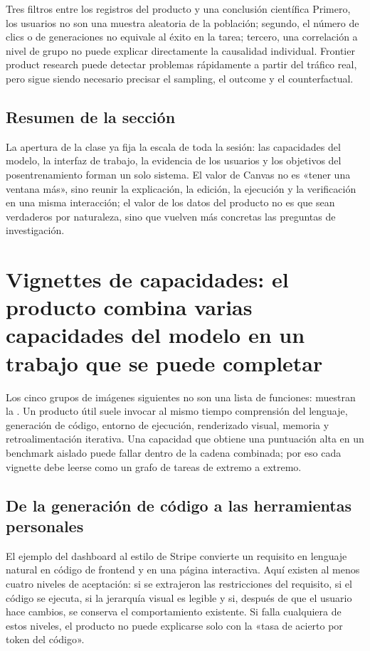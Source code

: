 \documentclass[a4paper]{article}
\begin{document}
\begin{warningbox}{Tres filtros entre los registros del producto y una conclusión científica}
Primero, los usuarios no son una muestra aleatoria de la población; segundo, el número de clics o de generaciones no equivale al éxito en la tarea; tercero, una correlación a nivel de grupo no puede explicar directamente la causalidad individual. Frontier product research puede detectar problemas rápidamente a partir del tráfico real, pero sigue siendo necesario precisar el sampling, el outcome y el counterfactual.
\end{warningbox}

\subsection{Resumen de la sección}

La apertura de la clase ya fija la escala de toda la sesión: las capacidades del modelo, la interfaz de trabajo, la evidencia de los usuarios y los objetivos del posentrenamiento forman un solo sistema. El valor de Canvas no es «tener una ventana más», sino reunir la explicación, la edición, la ejecución y la verificación en una misma interacción; el valor de los datos del producto no es que sean verdaderos por naturaleza, sino que vuelven más concretas las preguntas de investigación.
\section{Vignettes de capacidades: el producto combina varias capacidades del modelo en un trabajo que se puede completar}

Los cinco grupos de imágenes siguientes no son una lista de funciones: muestran la . Un producto útil suele invocar al mismo tiempo comprensión del lenguaje, generación de código, entorno de ejecución, renderizado visual, memoria y retroalimentación iterativa. Una capacidad que obtiene una puntuación alta en un benchmark aislado puede fallar dentro de la cadena combinada; por eso cada vignette debe leerse como un grafo de tareas de extremo a extremo.

\subsection{De la generación de código a las herramientas personales}

El ejemplo del dashboard al estilo de Stripe convierte un requisito en lenguaje natural en código de frontend y en una página interactiva. Aquí existen al menos cuatro niveles de aceptación: si se extrajeron las restricciones del requisito, si el código se ejecuta, si la jerarquía visual es legible y si, después de que el usuario hace cambios, se conserva el comportamiento existente. Si falla cualquiera de estos niveles, el producto no puede explicarse solo con la «tasa de acierto por token del código».
\end{document}
